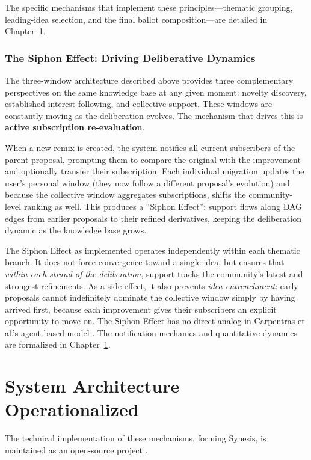 \documentclass[a4paper, 12pt, twoside]{iviathesis}
\begin{document}
The specific mechanisms that implement these principles---thematic grouping, leading-idea selection, and the final ballot composition---are detailed in Chapter~\ref{ch:operationalized}.

\subsection{The Siphon Effect: Driving Deliberative Dynamics}
\label{sec:siphon-effect}

The three-window architecture described above provides three complementary perspectives on the same knowledge base at any given moment: novelty discovery, established interest following, and collective  support. 
These windows are constantly moving as the deliberation evolves. The mechanism that drives this is \textbf{active subscription re-evaluation}.

When a new remix is created, the system notifies all current subscribers of the parent proposal, prompting them to compare the original with the improvement and optionally transfer their subscription. Each individual migration updates the user's personal window (they now follow a different proposal's evolution) and because the collective window aggregates subscriptions, shifts the community-level ranking as well. This produces a ``Siphon Effect'': support flows along DAG edges from earlier proposals to their refined derivatives, keeping the deliberation dynamic as the knowledge base grows.

The Siphon Effect as implemented operates independently within each thematic branch. It does not force convergence toward a single idea, but ensures that \textit{within each strand of the deliberation}, support tracks the community's latest and strongest refinements. As a side effect, it also prevents \textit{idea entrenchment}: early proposals cannot indefinitely dominate the collective window simply by having arrived first, because each improvement gives their subscribers an explicit opportunity to move on. The Siphon Effect has no direct analog in Carpentras et al.'s agent-based model \cite{carpentras_wisdom_2025}. The notification mechanics and quantitative dynamics are formalized in Chapter~\ref{ch:operationalized}.

\chapter{System Architecture Operationalized}
\label{ch:operationalized}

The technical implementation of these mechanisms, forming Synesis, is maintained as an open-source project \cite{drp_repo}.
\end{document}
